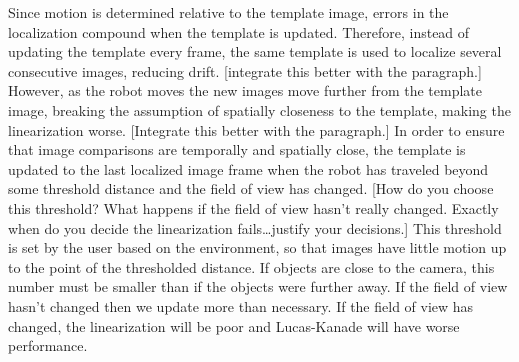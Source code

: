 \documentclass[letterpaper, 10 pt, conference]{ieeeconf}
\newcommand{\comment}[1]{{\color{red}[#1]}}
\begin{document}
Since motion is determined relative to the template image, errors in the localization compound when the template is updated. Therefore, instead of updating the template every frame, the same template is used to localize several consecutive images, reducing drift.
\comment{integrate this better with the paragraph.} However, as the robot moves the new images move further from the template image, breaking the assumption of spatially closeness to the template, making the linearization worse. 
\comment{Integrate this better with the paragraph.} In order to ensure that image comparisons are temporally and spatially close, the template is updated to the last localized image frame when the robot has traveled beyond some threshold distance and the field of view has changed.
\comment{How do you choose this threshold?  What happens if the field of view hasn’t really changed.  Exactly when do you decide the linearization fails…justify your decisions.} This threshold is set by the user based on the environment, so that images have little motion up to the point of the thresholded distance. If objects are close to the camera, this number must be smaller than if the objects were further away. If the field of view hasn't changed then we update more than necessary. If the field of view has changed, the linearization will be poor and Lucas-Kanade will have worse performance.
\end{document}
